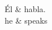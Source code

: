 \documentclass[a4paper]{article}
\begin{document}
\begin{dependency}
\begin{deptext}
{\'E}l \& habla. \\
he  \& speaks \\
\end{deptext}
\end{dependency}
\end{document}
